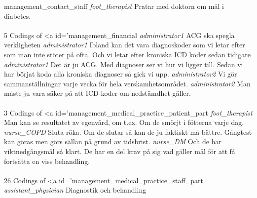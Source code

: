 \documentclass[12pt,a4paper,oneside]{article}
\begin{document}
management\_contact\_staff %
 {\it foot\_therapist %
} 
Pratar med doktorn om mål i diabetes. %
\\
\\
5 Codings of <a id='management\_financial %
 {\it  administrator1 %
} 
ACG ska spegla verkligheten %
 {\it administrator1 %
} 
Ibland kan det vara diagnoskoder som vi letar efter som man inte stöter på ofta. Och vi letar efter kroniska ICD koder sedan tidigare %
 {\it administrator1 %
} 
Det är ju ACG. Med diagnoser ser vi hur vi ligger till. Sedan vi har börjat  koda alla kroniska diagnoser så gick vi upp.  %
 {\it administrator2 %
} 
Vi gör sammanställningar varje vecka för hela verskamhetsområdet. %
 {\it administrator2 %
} 
Man måste ju vara säker på att ICD-koder om nedstämdhet gäller.  %
\\
\\
3 Codings of <a id='management\_medical\_practice\_patient\_part %
 {\it  foot\_therapist %
} 
Man kan se  resultatet av egenvård,  om t.ex. Om de smörjt i fötterna varje dag. %
 {\it nurse\_COPD %
} 
Sluta röka. Om de slutar så kan de ju faktiskt må bättre. Gångtest kan göras men görs sällan på grund av tidsbrist. %
 {\it nurse\_DM %
} 
Och de har viktnedgångsmål så klart. De har en del krav på sig vad gäller mål för att få fortsätta en viss behandling. %
\\
\\
26 Codings of <a id='management\_medical\_practice\_staff\_part %
 {\it  assistant\_physician %
} 
Diagnostik och behandling %
\end{document}
